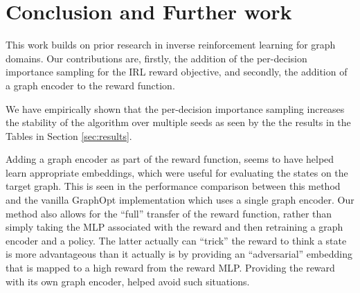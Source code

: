 \documentclass{report}
\numberwithin{equation}{section}
\numberwithin{figure}{section}
\numberwithin{table}{section}
\numberwithin{algorithm}{section}
\begin{document}

\chapter{Conclusion and Further work}\label{chap:conclusion}
This work builds on prior research in inverse reinforcement learning 
for graph domains. Our contributions are, firstly, the addition of the 
per-decision importance sampling for the IRL reward objective, 
and 
secondly, the addition of a graph encoder to the reward function.

We have empirically shown that the per-decision importance 
sampling increases
the stability of the algorithm over multiple seeds as seen by 
the the results in the Tables in Section \ref{sec:results}.

Adding a graph encoder as part of the reward function, seems to 
have helped learn appropriate embeddings, which were useful for 
evaluating the states on the target graph. This is seen in the 
performance comparison between this method and 
the vanilla GraphOpt \citep{GraphOpt} 
implementation which uses a single graph encoder. Our method 
also allows for the ``full'' transfer of the reward function, 
rather than simply taking the MLP associated with the reward and 
then retraining a graph encoder and a policy. The latter actually 
can ``trick'' the reward to think a state is more advantageous than 
it actually is by providing an ``adversarial'' embedding that is 
mapped to a high reward from the reward MLP. Providing the reward 
with its own graph encoder, helped avoid such situations.
\end{document}
